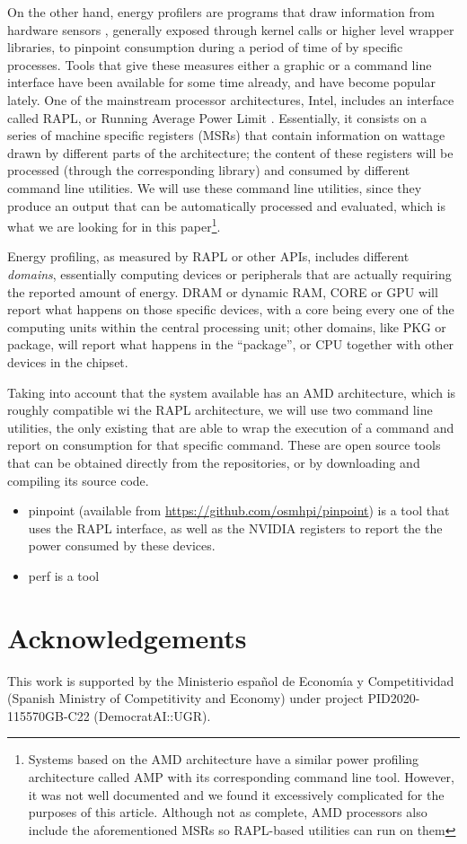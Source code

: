 \documentclass[a4paper,twoside]{article}
\begin{document}
On the other hand, energy profilers are programs that draw information from
hardware sensors \cite{sinha2001jouletrack}, generally exposed through kernel
calls or higher level wrapper libraries, to pinpoint consumption during a period
of time of by specific processes. Tools that give these measures either a
graphic or a command line interface have been available for some time already,
and have become popular lately. One of the mainstream processor architectures,
Intel, includes an interface called RAPL, or Running Average Power Limit
\cite{rapl}. Essentially, it consists on a series of machine specific registers
(MSRs) that contain information on wattage drawn by different parts of the
architecture; the content of these registers will be processed (through the
corresponding library) and consumed by different command line utilities. We will
use these command line utilities, since they produce an output that can be
automatically processed and evaluated, which is what we are looking for in this
paper\footnote{Systems based on the AMD architecture have a similar power
  profiling architecture called AMP with its corresponding command line
  tool. However, it was not well documented and we found it excessively
  complicated for the purposes of this article. Although not as complete, AMD
  processors also include the aforementioned MSRs so RAPL-based utilities can
  run on them}.

Energy profiling, as measured by RAPL or other APIs, includes different
\emph{domains}, essentially computing devices or peripherals that are actually
requiring the reported amount of energy. DRAM or dynamic RAM, CORE or GPU will
report what happens on those specific devices, with a core being every one of
the computing units within the central processing unit; other domains, like PKG or
package, will report what happens in the ``package'', or CPU together with other
devices in the chipset.

Taking into account that the system available has an AMD architecture, which is
roughly compatible wi the RAPL architecture, we will use two command line
utilities, the only existing that are able to wrap the execution of a command
and report on consumption for that specific command. These are open source tools
that can be obtained directly from the repositories, or by downloading and
compiling its source code. \begin{itemize}
\item {\sf pinpoint}\cite{9307947} (available from
  \url{https://github.com/osmhpi/pinpoint}) is a tool that uses the RAPL
  interface, as well as the NVIDIA registers to report the the power consumed by
  these devices.
\item {\sf perf} is a tool
  \end{itemize}

\section*{Acknowledgements}

This work is supported by the Ministerio espa\~{n}ol de Econom\'{\i}a y
Competitividad (Spanish Ministry of Competitivity and Economy) under project
PID2020-115570GB-C22 (DemocratAI::UGR).



{\small
}
\end{document}
